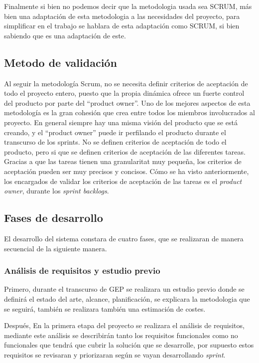 Finalmente si bien no podemos decir que la metodologia usada sea SCRUM, más bien una adaptación de esta metodologia a las necesidades del proyecto, para simplificar en el trabajo se hablara de esta adaptación como SCRUM, si bien sabiendo que es una adaptación de este.
\newpage
\subsection{Metodo de validación}
Al seguir la metodología Scrum, no se necesita definir criterios de aceptación de todo el proyecto entero, puesto que la propia dinámica ofrece un fuerte control del producto por parte del ``product owner''.
Uno de los mejores aspectos de esta metodología es la gran cohesión que crea entre todos los miembros involucrados al proyecto. En general siempre hay una misma visión del producto que se está creando, y el ``product owner'' puede ir perfilando el producto durante el transcurso de los sprints.
No se definen criterios de aceptación de todo el producto, pero si que se definen criterios de aceptación de las diferentes tareas. Gracias a que las tareas tienen una granularitat muy pequeña, los criterios de aceptación pueden ser muy precisos y concisos.
Cómo se ha visto anteriormente, los encargados de validar los criterios de aceptación de las tareas es el \textit{product owner}, durante los \textit{sprint backlogs}.

\subsection{Fases de desarrollo}
El desarrollo del sistema constara de cuatro fases, que se realizaran de manera secuencial de la siguiente manera.

\subsubsection{Análisis de requisitos y estudio previo}
Primero, durante el transcurso de GEP se realizara un estudio previo donde se definirá el estado del arte, alcance, planificación, se explicara la metodologia que se seguirá, también se realizara también una estimación de costes.

Después, En la primera etapa del proyecto se realizara el análisis de requisitos, mediante este análisis se describirán tanto los requisitos funcionales como no funcionales que tendrá que cubrir la solución que se desarrolle, por supuesto estos requisitos se revisaran y priorizaran según se vayan desarrollando \textit{sprint}.

